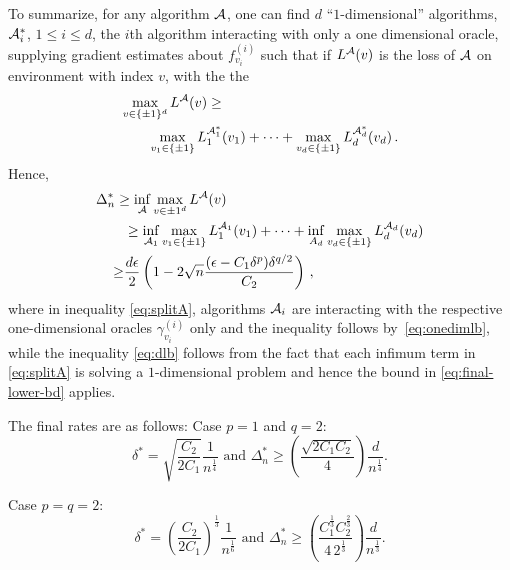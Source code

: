 To summarize, 
for any algorithm $\mathcal{A}$, one can find $d$ ``$1$-dimensional'' algorithms, $\mathcal{A}_i^*$, $1\le i \le d$,
the $i$th algorithm interacting with only a one dimensional oracle, supplying gradient estimates about $f_{v_i}^{(i)}$ 
such that if $L^{\mathcal{A}}(v)$ is the loss of $\mathcal{A}$ on environment with index $v$, with the 
the 
\begin{align}
\label{eq:onedimlb}
\begin{split}
\MoveEqLeft \max_{v\in \{\pm 1\}^d} L^{\A}(v) 
\ge \\
&  \max_{v_1\in \{\pm 1\}} L_1^{\A_1^*}(v_1) + \dots + \max_{v_d\in \{\pm 1 \}} L_d^{\A^*_d}(v_d)\,.
\end{split}
\end{align}
Hence,
\begin{align}
\MoveEqLeft
\Delta_n^*  \ge  \inf_{\A} \max_{v\in {\pm 1}^d} L^\A(v) \nonumber\\
 & \ge \inf_{\A_1} \max_{v_1\in \{\pm 1\}} L_1^{\A_1}(v_1) + \dots + 
 			\inf_{A_d} \max_{v_d\in \{\pm 1 \}} L_d^{\A_d}(v_d) \label{eq:splitA}\\
              \ge & \dfrac{d\epsilon}{2} \left(1 - 2\sqrt{n}  \dfrac{(\epsilon-C_1\delta^p)\delta^{q/2}}{C_2}\right)\,, \label{eq:dlb}
\end{align}
where in inequality \eqref{eq:splitA}, algorithms $\mathcal{A}_i$ are interacting with the respective one-dimensional oracles $\gamma^{(i)}_{v_i}$ only 
and the inequality follows by~\eqref{eq:onedimlb},
while the inequality \eqref{eq:dlb} follows from the fact that each infimum term in \eqref{eq:splitA} is solving a $1$-dimensional problem and hence the bound in \eqref{eq:final-lower-bd} applies. 

The final rates are as follows:
Case $p=1$ and $q=2$:
\[
\delta^*= \sqrt{\dfrac{C_2}{2C_1}}\dfrac{1}{n^{\frac{1}{4}}} \text{ and } 
\Delta_n^* \ge \left(\dfrac{\sqrt{2C_1C_2}}{4}\right)\dfrac{d}{n^{\frac{1}{4}}}.
\]

Case $p=q=2$:
\[
\delta^*= \left(\dfrac{C_2}{2C_1}\right)^{\frac{1}{3}}\dfrac{1}{n^{\frac{1}{6}}} \text{ and } \Delta_n^* \ge \left(\dfrac{C_1^{\frac{1}{3}}C_2^{\frac{2}{3}}}{4\, 2^{\frac{1}{3}}}\right)\dfrac{d}{n^{\frac{1}{3}}}.
\]

